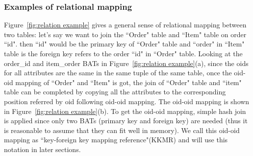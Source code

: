 \documentclass{vldb}
\begin{document}
\subsubsection{Examples of relational mapping}
Figure~\ref{fig:relation example} gives a general sense of relational mapping between two tables: let's say we want to join the ``Order" table and ``Item" table on order ``id".
then ``id" would be the primary key of ``Order" table and ``order" in ``Item" table is the foreign key refers to the order ``id" in ``Order" table. Looking at the order\_id and 
item\_order BATs in Figure~\ref{fig:relation example}(a), since the oids for all attributes are the same in the same tuple of the same table, once the oid-oid mapping of ``Order" and ``Item" is got, the join of ``Order" table and ``item" table can be completed by copying all the attributes to the corresponding position referred by oid following oid-oid mapping. The oid-oid mapping is shown in Figure~\ref{fig:relation example}(b). To get the oid-oid mapping, simple hash join is applied since only two BATs (primary key and foreign key) are needed (thus it is reasonable to assume that they can fit well in memory). We call this oid-oid mapping as ``key-foreign key mapping reference"(KKMR) and will use this notation in later sections.

\end{document}
